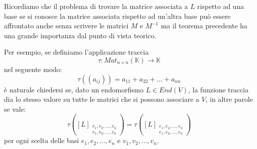 Ricordiamo che il problema di trovare la matrice associata a $L$ rispetto ad una
base se si conosce la matrice associata rispetto ad un'altra base pu\`o essere
affrontato anche senza scrivere le matrici $M$ e $M^{-1}$ ma il teorema precedente
ha una grande importanza dal punto di vista teorico.

Per esempio, se definiamo l'applicazione traccia
\begin{equation*}
	\tau : Mat_{n \times n}(\mathbb{K}) \to \mathbb{K}
\end{equation*}
nel seguente modo:
\begin{equation*}
	\tau((a_{ij})) = a_{11} + a_{22} + \dots + a_{nn}
\end{equation*}
\`e naturale chiedersi se, dato un endomorfismo $L \in End(V)$, la funzione traccia
dia lo stesso valore su tutte le matrici che si possono associare a $V$, in altre
parole se vale:
\begin{equation*}
	\tau \left(
	[L]_{\substack{
			v_1, v_2, \dots, v_n \\
			v_1, v_2, \dots, v_n
		}}
	\right) =
	\tau \left(
	[L]_{\substack{
			e_1, e_2, \dots, e_n \\
			e_1, e_2, \dots, e_n
		}}
	\right)
\end{equation*}
per ogni scelta delle basi $e_1, e_2, \dots, e_n$ e $v_1, v_2, \dots, v_n$.

